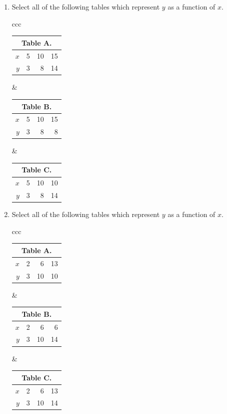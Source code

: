 \begin{enumerate}
\item Select all of the following tables which represent $y$ as a function of $x$.
\begin{center}
\begin{tabular}{ccc}
\begin{tabular}{rrrr}
\multicolumn{4}{c}{Table A.}\tabularnewline
\toprule
$x$ & 5 & 10 & 15\tabularnewline
\midrule
$y$ & 3 & 8 & 14\tabularnewline
\bottomrule
\end{tabular}
&
\begin{tabular}{rrrr}
\multicolumn{4}{c}{Table B.}\tabularnewline
\toprule
$x$ & 5 & 10 & 15\tabularnewline
\midrule
$y$ & 3 & 8 & 8\tabularnewline
\bottomrule
\end{tabular}
&
\begin{tabular}{rrrr}
\multicolumn{4}{c}{Table C.}\tabularnewline
\toprule
$x$ & 5 & 10 & 10\tabularnewline
\midrule
$y$ & 3 & 8 & 14\tabularnewline
\bottomrule
\end{tabular}
\end{tabular}
\end{center}

\item Select all of the following tables which represent $y$ as a function of $x$.
\begin{center}
\begin{tabular}{ccc}
\begin{tabular}{rrrr}
\multicolumn{4}{c}{Table A.}\tabularnewline
\toprule
$x$ & 2 & 6 & 13\tabularnewline
\midrule
$y$ & 3 & 10 & 10\tabularnewline
\bottomrule
\end{tabular}
&
\begin{tabular}{rrrr}
\multicolumn{4}{c}{Table B.}\tabularnewline
\toprule
$x$ & 2 & 6 & 6\tabularnewline
\midrule
$y$ & 3 & 10 & 14\tabularnewline
\bottomrule
\end{tabular}
&
\begin{tabular}{rrrr}
\multicolumn{4}{c}{Table C.}\tabularnewline
\toprule
$x$ & 2 & 6 & 13\tabularnewline
\midrule
$y$ & 3 & 10 & 14\tabularnewline
\bottomrule
\end{tabular}
\end{tabular}
\end{center}


\end{enumerate}
